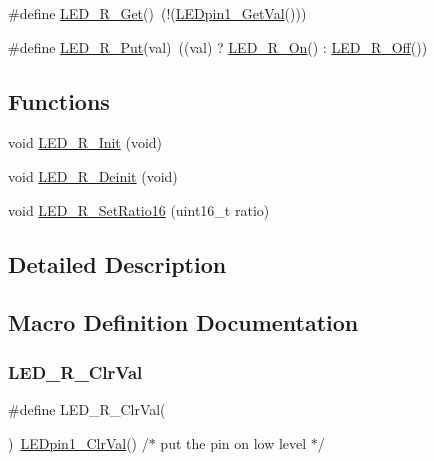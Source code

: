 \begin{DoxyCompactItemize}
\item 
\#define \hyperlink{group___l_e_d___r__module_ga29f013a52f94806041915e77616a1431}{L\+E\+D\+\_\+\+R\+\_\+\+Get}()~(!(\hyperlink{group___l_e_dpin1__module_ga452621fabd51a8ab50951b9d318dff24}{L\+E\+Dpin1\+\_\+\+Get\+Val}()))
\item 
\#define \hyperlink{group___l_e_d___r__module_gae74edd27f1c938ad9f0bebca4110d2ff}{L\+E\+D\+\_\+\+R\+\_\+\+Put}(val)~((val) ? \hyperlink{group___l_e_d___r__module_gae4d0b3ab736a2cc7cb11ae20c5a77193}{L\+E\+D\+\_\+\+R\+\_\+\+On}() \+: \hyperlink{group___l_e_d___r__module_gaaa72e85cdb5b4b9f9b25782ede21da2a}{L\+E\+D\+\_\+\+R\+\_\+\+Off}())
\end{DoxyCompactItemize}
\subsection*{Functions}
\begin{DoxyCompactItemize}
\item 
void \hyperlink{group___l_e_d___r__module_ga751542b52d0a6cbb752670e59242c52d}{L\+E\+D\+\_\+\+R\+\_\+\+Init} (void)
\item 
void \hyperlink{group___l_e_d___r__module_gaf1fe3bd171759bfe9d6c571819e43027}{L\+E\+D\+\_\+\+R\+\_\+\+Deinit} (void)
\item 
void \hyperlink{group___l_e_d___r__module_ga7dd4cf455d1968e98a43a05abf7e4b10}{L\+E\+D\+\_\+\+R\+\_\+\+Set\+Ratio16} (uint16\+\_\+t ratio)
\end{DoxyCompactItemize}


\subsection{Detailed Description}


\subsection{Macro Definition Documentation}
\mbox{\label{group___l_e_d___r__module_ga7209f37f1b2eaf2d8d8cdfda04bbc013}} 
\subsubsection{\texorpdfstring{L\+E\+D\+\_\+\+R\+\_\+\+Clr\+Val}{LED\_R\_ClrVal}}
{\footnotesize\ttfamily \#define L\+E\+D\+\_\+\+R\+\_\+\+Clr\+Val(\begin{DoxyParamCaption}{ }\end{DoxyParamCaption})~\hyperlink{group___l_e_dpin1__module_gaa8cd76132679a45d7b46009191d7c936}{L\+E\+Dpin1\+\_\+\+Clr\+Val}() /$\ast$ put the pin on low level $\ast$/}

